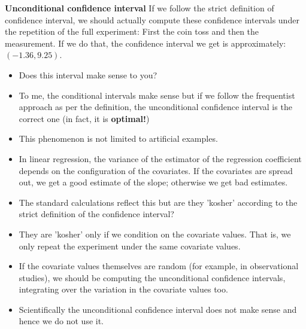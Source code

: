 \documentclass[10pt]{beamer}
\begin{document}
\begin{frame}
\textbf {Unconditional confidence interval}
If we follow the strict definition of confidence interval, we should actually compute these confidence intervals under the repetition of the full experiment: First the coin toss and then the measurement. If we do that, the confidence interval we get is approximately: $(-1.36,9.25)$.\\
\begin{itemize}
\pause
\item Does this interval make sense to you?\\
\pause
\item To me, the conditional intervals make sense but if we follow the frequentist approach as per the definition, the unconditional confidence interval is the correct one (in fact, it is \alert {\textbf{optimal!})}\\
\end{itemize}
\end{frame}

\begin{frame}
\begin{itemize}

\item This phenomenon is not limited to artificial examples. 
\pause
\item In linear regression, the variance of the estimator of the regression coefficient depends on the configuration of the covariates. If the covariates are spread out, we get a good estimate of the slope; otherwise we get bad estimates. 
\pause
\item The standard calculations reflect this but are they 'kosher' according to the strict definition of the confidence interval? 
\pause
\item They are 'kosher' only if we condition on the covariate values. That is, we only repeat the experiment under the same covariate values. 
\pause
\item If the covariate values themselves are random (for example, in observational studies), we should be computing the unconditional confidence intervals, integrating over the variation in the covariate values too. 
\pause
\item Scientifically the unconditional confidence interval does not make sense and hence we do not use it. 
\end{itemize}

\end{frame}
\end{document}

